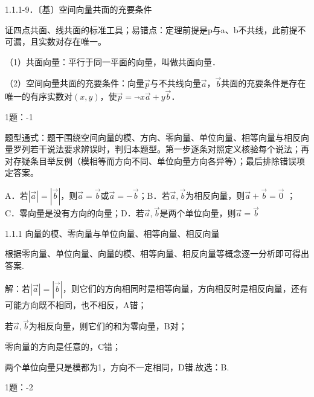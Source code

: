 1.1.1-9．〔基〕空间向量共面的充要条件

证四点共面、线共面的标准工具；易错点：定理前提是p与a、b不共线，此前提不可漏，且实数对存在唯一。

（1）共面向量：平行于同一平面的向量，叫做共面向量．

（2）空间向量共面的充要条件：向量\(\overrightarrow{p}\)与不共线向量\(\overrightarrow{a}\)，\(\overrightarrow{b}\)共面的充要条件是存在唯一的有序实数对\((x,y)\)，使\(\overrightarrow{p} =\)\(\overrightarrow{}x\overrightarrow{a} + y\overrightarrow{b}\)．


1题：-1

题型通式：题干围绕空间向量的模、方向、零向量、单位向量、相等向量与相反向量罗列若干说法要求辨误时，判归本题型。第一步逐条对照定义核验每个说法；再对存疑条目举反例（模相等而方向不同、单位向量方向各异等）；最后排除错误项定答案。


 \noindent A．若\(\left| \overrightarrow{a} \right| = \allowbreak\left| \overrightarrow{b} \right|\)，则\(\overrightarrow{a} = \overrightarrow{b}\)或\(\overrightarrow{a} = - \overrightarrow{b}\)；B．若\(\overrightarrow{a},\overrightarrow{b}\)为相反向量，则\(\overrightarrow{a} + \overrightarrow{b} = \overrightarrow{0}\)
；C．零向量是没有方向的向量；D．若\(\overrightarrow{a},\overrightarrow{b}\)是两个单位向量，则\(\overrightarrow{a} = \overrightarrow{b}\)

\noindent\hangindent=7mm\quad{}1.1.1 向量的模、零向量与单位向量、相等向量、相反向量

根据零向量、单位向量、向量的模、相等向量、相反向量等概念逐一分析即可得出答案.

解：若\(\left| \overrightarrow{a} \right| = \allowbreak\left| \overrightarrow{b} \right|\)，则它们的方向相同时是相等向量，方向相反时是相反向量，还有可能方向既不相同，也不相反，A错；

若\(\overrightarrow{a},\overrightarrow{b}\)为相反向量，则它们的和为零向量，B对；

零向量的方向是任意的，C错；

两个单位向量只是模都为1，方向不一定相同，D错.故选：B.


1题：-2

